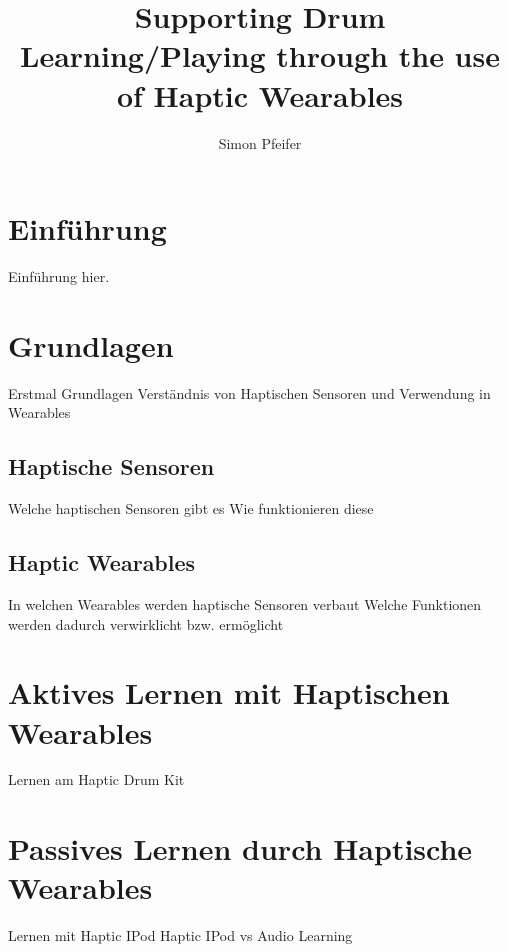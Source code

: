 \documentclass[ngerman,runningheads,a4paper]{llncs}
\begin{document}
\title{Supporting Drum Learning/Playing through the use of Haptic Wearables}
\author{Simon Pfeifer}
\maketitle
\begin{abstract}

\end{abstract}
\section{Einführung}
Einführung hier.
\section{Grundlagen}
Erstmal Grundlagen
Verständnis von Haptischen Sensoren
und Verwendung in Wearables
\subsection{Haptische Sensoren}
Welche haptischen Sensoren gibt es
Wie funktionieren diese
\subsection{Haptic Wearables}
In welchen Wearables werden haptische Sensoren verbaut
Welche Funktionen werden dadurch verwirklicht bzw. ermöglicht
\section{Aktives Lernen mit Haptischen Wearables}
Lernen am Haptic Drum Kit
\section{Passives Lernen durch Haptische Wearables}
Lernen mit Haptic IPod
Haptic IPod vs Audio Learning




\end{document}
